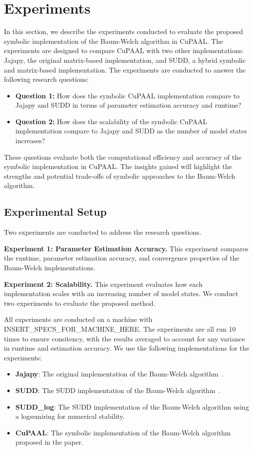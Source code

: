 \section{Experiments}\label{sec:experiments}
In this section, we describe the experiments conducted to evaluate the proposed symbolic implementation of the Baum-Welch algorithm in CuPAAL. 
The experiments are designed to compare CuPAAL with two other implementations: Jajapy, the original matrix-based implementation, and SUDD, a hybrid symbolic and matrix-based implementation.
The experiments are conducted to answer the following research questions:

\begin{itemize}
    \item \textbf{Question 1:} How does the symbolic CuPAAL implementation compare to Jajapy and SUDD in terms of parameter estimation accuracy and runtime?
    \item \textbf{Question 2:} How does the scalability of the symbolic CuPAAL implementation compare to Jajapy and SUDD as the number of model states increases?
\end{itemize}

These questions evaluate both the computational efficiency and accuracy of the symbolic implementation in CuPAAL. The insights gained will highlight the strengths and potential trade-offs of symbolic approaches to the Baum-Welch algorithm.

\subsection{Experimental Setup}
Two experiments are conducted to address the research questions.

\textbf{Experiment 1: Parameter Estimation Accuracy.} This experiment compares the runtime, parameter estimation accuracy, and convergence properties of the Baum-Welch implementations.

\textbf{Experiment 2: Scalability.} This experiment evaluates how each implementation scales with an increasing number of model states.
We conduct two experiments to evaluate the proposed method.

All experiments are conducted on a machine with INSERT\_SPECS\_FOR\_MACHINE\_HERE.
The experiments are all run 10 times to ensure consitency, with the results averaged to account for any variance in runtime and estimation accuracy.
We use the following implementations for the experiments:
\begin{itemize}
    \item \textbf{Jajapy}: The original implementation of the Baum-Welch algorithm~\cite{reynouard2023jajapy}.
    \item \textbf{SUDD}: The SUDD implementation of the Baum-Welch algorithm~\cite{p7}.
    \item \textbf{SUDD\_log}: The SUDD implementation of the Baum-Welch algorithm using a logsemiring for numerical stability.
    \item \textbf{CuPAAL}: The symbolic implementation of the Baum-Welch algorithm proposed in the paper.
\end{itemize}

